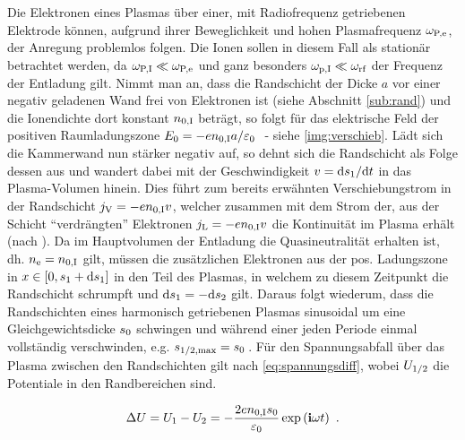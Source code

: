       Die Elektronen eines Plasmas über einer, mit Radiofrequenz getriebenen Elektrode können, aufgrund ihrer Beweglichkeit und hohen Plasmafrequenz $\omega_\text{P,e}$, der Anregung problemlos folgen. Die Ionen sollen in diesem Fall als stationär betrachtet werden, da $\omega_\text{P,I}\ll\omega_\text{P,e}$ und ganz besonders $\omega_\text{p,I}\ll\omega_\text{rf}$ der Frequenz der Entladung gilt. Nimmt man an, dass die Randschicht der Dicke $a$ vor einer negativ geladenen Wand frei von Elektronen ist (siehe Abschnitt \ref{sub:rand}) und die Ionendichte dort konstant $n_\text{0,I}$ beträgt, so folgt für das elektrische Feld der positiven Raumladungszone $E_\text{0}=-en_\text{0,I}a/\varepsilon_\text{0}\,\,$ - siehe \autoref{img:verschieb}. Lädt sich die Kammerwand nun stärker negativ auf, so dehnt sich die Randschicht als Folge dessen aus und wandert dabei mit der Geschwindigkeit $v=\textnormal{d} s_\text{1}/\textnormal{d} t$ in das Plasma-Volumen hinein. Dies führt zum bereits erwähnten Verschiebungstrom in der Randschicht $j_\text{V}=-en_\text{0,I}v$, welcher zusammen mit dem Strom der, aus der Schicht "`verdrängten"' Elektronen $j_\text{L}=-en_\text{0,I}v$ die Kontinuität im Plasma erhält (nach \cite{Godyak90d}). Da im Hauptvolumen der Entladung die Quasineutralität erhalten ist, dh. $n_\text{e}=n_\text{0,I}$ gilt, müssen die zusätzlichen Elektronen aus der pos. Ladungszone in $x\in\left[0,s_\text{1}+\textnormal{d} s_\text{1}\right]$ in den Teil des Plasmas, in welchem zu diesem Zeitpunkt die Randschicht schrumpft und $\textnormal{d} s_\text{1}=-\textnormal{d} s_\text{2}$ gilt. Daraus folgt wiederum, dass die Randschichten eines harmonisch getriebenen Plasmas sinusoidal um eine Gleichgewichtsdicke $s_\text{0}$ schwingen und während einer jeden Periode einmal vollständig verschwinden, e.g. $s_\text{1/2,max}=s_\text{0}\,$.  Für den Spannungsabfall über das Plasma zwischen den Randschichten gilt nach \cite{Piel10} \autoref{eq:spannungsdiff}, wobei $U_\text{1/2}$ die Potentiale in den Randbereichen sind. 

        \begin{align}
          \Delta U=U_\text{1}-U_\text{2}=-\frac{2en_\text{0,I}s_\text{0}}{\varepsilon_\text{0}}\exp\left(\mathbf{i}\omega t\right)\,\,. \label{eq:spannungsdiff}
        \end{align}

      \subsection{}  \label{subsub:self-bias}

